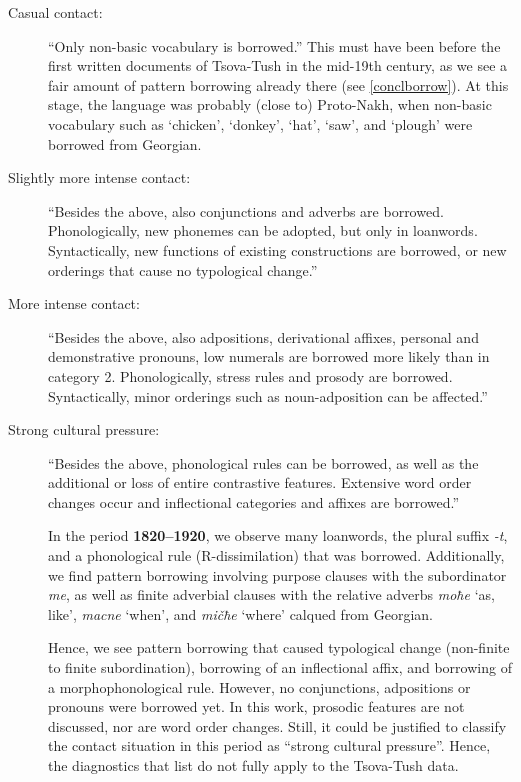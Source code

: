 \begin{description}
	\item[Casual contact:] ``Only non-basic vocabulary is borrowed.'' This must have been before the first written documents of Tsova-Tush in the mid-19th century, as we see a fair amount of pattern borrowing already there (see \ref{conclborrow}). At this stage, the language was probably (close to) Proto-Nakh, when non-basic vocabulary such as `chicken', `donkey', `hat', `saw', and `plough' were borrowed from Georgian.
	
	
	\item[Slightly more intense contact:] ``Besides the above, also conjunctions and adverbs are borrowed. Phonologically, new phonemes can be adopted, but only in loanwords. Syntactically, new functions of existing constructions are borrowed, or new orderings that cause no typological change.'' 
	
	\item[More intense contact:] ``Besides the above, also adpositions, derivational affixes, personal and demonstrative pronouns, low numerals are borrowed more likely than in category 2. Phonologically, stress rules and prosody are borrowed. Syntactically, minor orderings such as noun-adposition can be affected.'' 
	
	\item[Strong cultural pressure:] ``Besides the above, phonological rules can be borrowed, as well as the additional or loss of entire contrastive features. Extensive word order changes occur and inflectional categories and affixes are borrowed.'' 
	
	In the period \textbf{1820--1920}, we observe many loanwords, the plural suffix \textit{-t}, and a phonological rule (R-dissimilation) that was borrowed. Additionally, we find pattern borrowing involving purpose clauses with the subordinator \textit{me}, as well as finite adverbial clauses with the relative adverbs \textit{moħe} `as, like', \textit{macne} `when', and \textit{mičħe} `where' calqued from Georgian. 
	
	Hence, we see pattern borrowing that caused typological change (non-finite to finite subordination), borrowing of an inflectional affix, and borrowing of a morphophonological rule. However, no conjunctions, adpositions or pronouns were borrowed yet. In this work, prosodic features are not discussed, nor are word order changes. Still, it could be justified to classify the contact situation in this period as “strong cultural pressure”. Hence, the diagnostics that \citeauthor{thomasonkaufman1988} list do not fully apply to the Tsova-Tush data.
	

\end{description}
